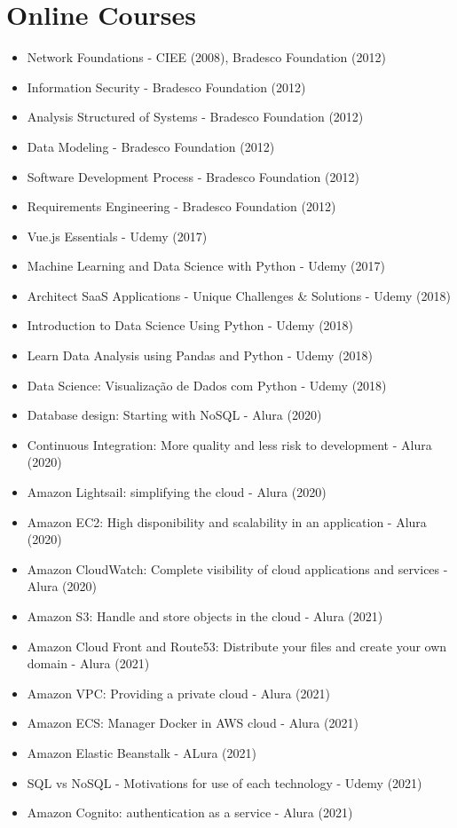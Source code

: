 \section{Online Courses}
\begin{itemize}
    \item Network Foundations - CIEE (2008), Bradesco Foundation (2012)
    \item Information Security - Bradesco Foundation (2012)
    \item Analysis Structured of Systems - Bradesco Foundation (2012)
    \item Data Modeling - Bradesco Foundation (2012)
    \item Software Development Process - Bradesco Foundation (2012)
    \item Requirements Engineering - Bradesco Foundation (2012)
    \item Vue.js Essentials - Udemy (2017)
    \item Machine Learning and Data Science with Python - Udemy (2017)
    \item Architect SaaS Applications - Unique Challenges & Solutions - Udemy (2018)
    \item Introduction to Data Science Using Python - Udemy (2018)
    \item Learn Data Analysis using Pandas and Python - Udemy (2018)
    \item Data Science: Visualização de Dados com Python - Udemy (2018)
    \item Database design: Starting with NoSQL - Alura (2020)
    \item Continuous Integration: More quality and less risk to development - Alura (2020)
    \item Amazon Lightsail: simplifying the cloud - Alura (2020)
    \item Amazon EC2: High disponibility and scalability in an application - Alura (2020)
    \item Amazon CloudWatch: Complete visibility of cloud applications and services - Alura (2020)
    \item Amazon S3: Handle and store objects in the cloud - Alura (2021)
    \item Amazon Cloud Front and Route53: Distribute your files and create your own domain - Alura (2021)
    \item Amazon VPC: Providing a private cloud - Alura (2021)
    \item Amazon ECS: Manager Docker in AWS cloud - Alura (2021)
    \item Amazon Elastic Beanstalk - ALura (2021)
    \item SQL vs NoSQL - Motivations for use of each technology - Udemy (2021)
    \item Amazon Cognito: authentication as a service - Alura (2021)
\end{itemize}

